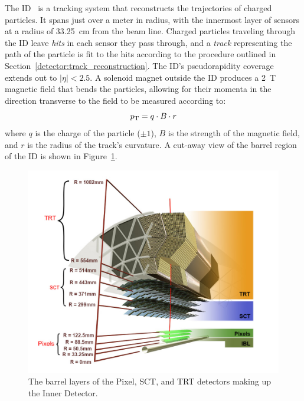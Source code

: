 ﻿The ID~\cite{1997.id-tdr-1, 1997.id-tdr-2} is a tracking system that reconstructs the trajectories of charged particles.
It spans just over a meter in radius, with the innermost layer of sensors at a radius of 33.25~cm from the beam line.
Charged particles traveling through the ID leave \emph{hits} in each sensor they pass through, and a \emph{track} representing the path of the particle is fit to the hits according to the procedure outlined in Section~\ref{detector:track_reconstruction}.
The ID's pseudorapidity coverage extends out to $|\eta| < 2.5$.
A solenoid magnet outside the ID produces a 2~T magnetic field that bends the particles, allowing for their momenta in the direction transverse to the field to be measured according to:
\begin{equation}
  \pt = q\cdot B\cdot r
  \label{eq:id_pt}
\end{equation}
where $q$ is the charge of the particle ($\pm 1$), $B$ is the strength of the magnetic field, and $r$ is the radius of the track's curvature.
A cut-away view of the barrel region of the ID is shown in Figure~\ref{fig:detector_ID}.

\begin{figure}
  \centering
  \includegraphics[width=.8\textwidth]{figs/detector/ID}
  \caption{The barrel layers of the Pixel, SCT, and TRT detectors making up the Inner Detector.}
  \label{fig:detector_ID}
\end{figure}

